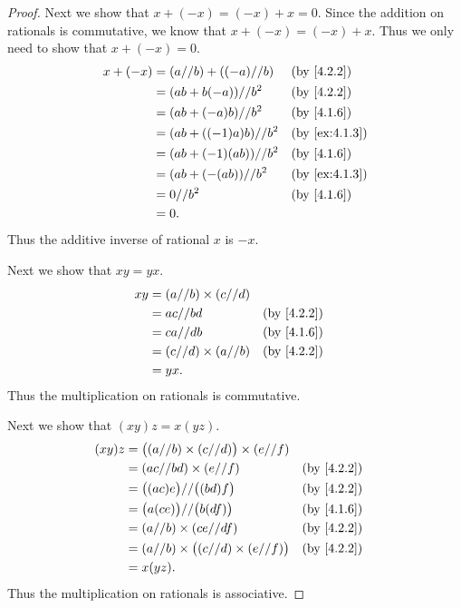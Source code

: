 \begin{proof}
  Next we show that \(x + (-x) = (-x) + x = 0\).
  Since the addition on rationals is commutative, we know that \(x + (-x) = (-x) + x\).
  Thus we only need to show that \(x + (-x) = 0\).
  \begin{align*}
    x + (-x) & = (a // b) + ((-a) // b) &  & \by{4.2.2}                  \\
             & = (ab + b(-a)) // b^2    &  & \by{4.2.2}                  \\
             & = (ab + (-a)b) // b^2    &  & \by{4.1.6}                  \\
             & = (ab + ((-1)a)b) // b^2 &  & \text{(by \cref{ex:4.1.3})} \\
             & = (ab + (-1)(ab)) // b^2 &  & \by{4.1.6}                  \\
             & = (ab + (-(ab)) // b^2   &  & \text{(by \cref{ex:4.1.3})} \\
             & = 0 // b^2               &  & \by{4.1.6}                  \\
             & = 0.
  \end{align*}
  Thus the additive inverse of rational \(x\) is \(-x\).

  Next we show that \(xy = yx\).
  \begin{align*}
    xy & = (a // b) \times (c // d)                 \\
       & = ac // bd                 &  & \by{4.2.2} \\
       & = ca // db                 &  & \by{4.1.6} \\
       & = (c // d) \times (a // b) &  & \by{4.2.2} \\
       & = yx.
  \end{align*}
  Thus the multiplication on rationals is commutative.

  Next we show that \((xy)z = x(yz)\).
  \begin{align*}
    (xy)z & = \big((a // b) \times (c // d)\big) \times (e // f)                 \\
          & = (ac // bd) \times (e // f)                         &  & \by{4.2.2} \\
          & = \big((ac)e\big) // \big((bd)f\big)                 &  & \by{4.2.2} \\
          & = \big(a(ce)\big) // \big(b(df)\big)                 &  & \by{4.1.6} \\
          & = (a // b) \times (ce // df)                         &  & \by{4.2.2} \\
          & = (a // b) \times \big((c // d) \times (e // f)\big) &  & \by{4.2.2} \\
          & = x(yz).
  \end{align*}
  Thus the multiplication on rationals is associative.


\end{proof}
